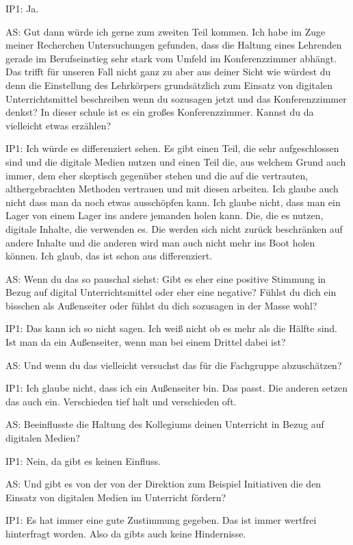 \documentclass[fontsize=11pt,paper=a4]{scrbook}
\begin{document}
{\begin{itemize*}
\item[IP1:] Ja.
\item[AS:] Gut dann würde ich gerne zum zweiten Teil kommen. Ich habe im Zuge meiner Recherchen Untersuchungen gefunden, dass 
die Haltung eines Lehrenden gerade im Berufseinstieg sehr stark vom Umfeld im Konferenzzimmer abhängt. Das trifft für unseren Fall nicht ganz zu aber aus deiner Sicht wie würdest du denn die Einstellung des Lehrkörpers grundsätzlich zum Einsatz von digitalen Unterrichtsmittel beschreiben wenn du sozusagen jetzt und das Konferenzzimmer denkst? In dieser schule ist es ein großes Konferenzzimmer. Kannst du da vielleicht etwas erzählen?
\item[IP1:] Ich würde es differenziert sehen. Es gibt einen Teil, die sehr aufgeschlossen sind und die digitale Medien nutzen und einen Teil die, aus welchem Grund auch immer, dem eher skeptisch gegenüber stehen und die auf die vertrauten, althergebrachten Methoden vertrauen und mit diesen arbeiten. Ich glaube auch nicht dass man da noch etwas ausschöpfen kann. Ich glaube nicht, dass man ein Lager von einem Lager ins andere jemanden holen kann. Die, die es nutzen, digitale Inhalte, die verwenden es. Die werden sich nicht zurück beschränken auf andere Inhalte und die anderen wird man auch nicht mehr ins Boot holen können. Ich glaub, das ist schon aus differenziert.
\item[AS:] Wenn du das so pauschal siehst: Gibt es eher eine positive Stimmung in Bezug auf digital Unterrichtsmittel oder eher eine negative?
Fühlst du dich ein bisschen als Außenseiter oder fühlst du dich sozusagen in der Masse wohl?
\item[IP1:] Das kann ich so nicht sagen. Ich weiß nicht ob es mehr als die Hälfte sind. Ist man da ein Außenseiter, wenn man bei einem Drittel dabei ist?
\item[AS:] Und wenn du das vielleicht versuchst das für die Fachgruppe abzuschätzen?
\item[IP1:] Ich glaube nicht, dass ich ein Außenseiter bin. Das passt. Die anderen setzen das auch ein. Verschieden tief halt und verschieden oft.
\item[AS:] Beeinflusste die Haltung des Kollegiums deinen Unterricht in Bezug auf digitalen Medien?
\item[IP1:] Nein, da gibt es keinen Einfluss.
\item[AS:] Und gibt es von der von der Direktion zum Beispiel Initiativen die den Einsatz von digitalen Medien im Unterricht fördern?
\item[IP1:] Es hat immer eine gute Zustimmung gegeben. Das ist immer wertfrei hinterfragt worden. Also da gibts auch keine Hindernisse.

\end{itemize*}}
\end{document}
